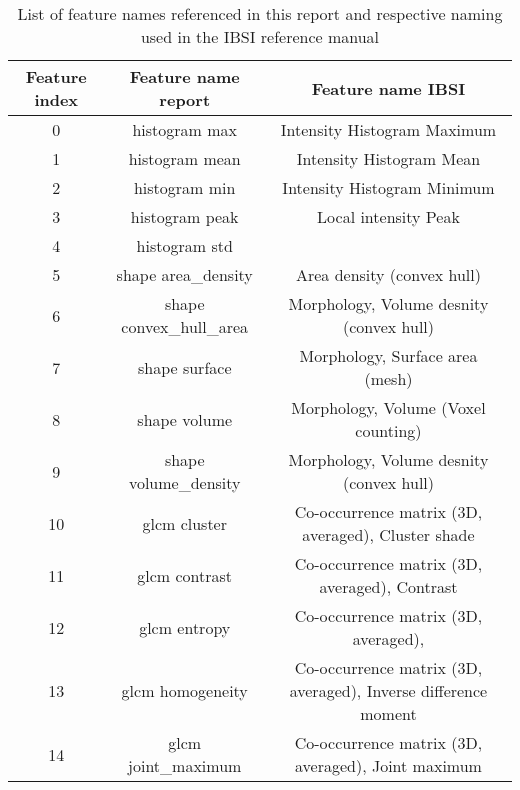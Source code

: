 \begin{table}[H]
    \centering
    \caption{List of feature names referenced in this report and
     respective naming used in the IBSI reference manual}  
    \label{tab:feature_names} 
    \begin{tabular}{|c|c|c|}
        \hline
        Feature index & Feature name report & Feature name IBSI \\
        \hline
        0            & histogram max & Intensity Histogram Maximum \\
        \hline
        1           & histogram mean & Intensity Histogram Mean\\
        \hline
        2            & histogram min & Intensity Histogram Minimum\\
        \hline
        3           & histogram peak & Local intensity Peak\\
        \hline
        4            & histogram std &   \\  %
        \hline
        5       & shape area\_density & Area density (convex hull)\\
        \hline
        6   & shape convex\_hull\_area & Morphology, Volume desnity (convex hull)\\
        \hline
        7            & shape surface & Morphology, Surface area (mesh)\\
        \hline
        8             & shape volume & Morphology, Volume (Voxel counting)\\
        \hline
        9     & shape volume\_density & Morphology, Volume desnity (convex hull)\\
        \hline
        10            & glcm cluster & Co-occurrence matrix (3D, averaged), Cluster shade \\ %
        \hline
        11           & glcm contrast & Co-occurrence matrix (3D, averaged), Contrast\\
        \hline
        12            & glcm entropy & Co-occurrence matrix (3D, averaged),\\ %
        \hline
        13        & glcm homogeneity & Co-occurrence matrix (3D, averaged), Inverse difference moment\\
        \hline
        14      & glcm joint\_maximum & Co-occurrence matrix (3D, averaged), Joint maximum\\
        \hline
    \end{tabular} 
\end{table}

